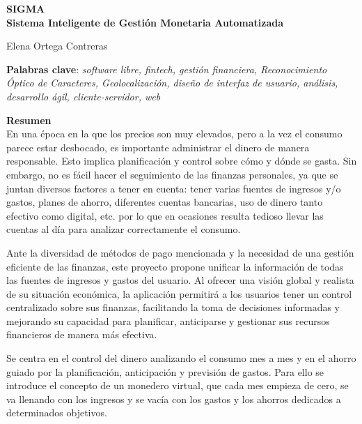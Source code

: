 \thispagestyle{empty}

\begin{center}
{\large\bfseries SIGMA \\ Sistema Inteligente de Gestión Monetaria Automatizada }\\
\end{center}
\begin{center}
Elena Ortega Contreras\\
\end{center}


\vspace{0.5cm}
\noindent\textbf{Palabras clave}: \textit{software libre, fintech, gestión financiera, Reconocimiento Óptico de Caracteres, Geolocalización, diseño de interfaz de usuario, análisis, desarrollo ágil, cliente-servidor, web}
\vspace{0.7cm}

\noindent\textbf{Resumen}\\

En una época en la que los precios son muy elevados, pero a la vez el consumo parece estar desbocado, es importante administrar el dinero de manera responsable. Esto implica planificación y control sobre cómo y dónde se gasta. Sin embargo, no es fácil hacer el seguimiento de las finanzas personales, ya que se juntan diversos factores a tener en cuenta: tener varias fuentes de ingresos y/o gastos, planes de ahorro, diferentes cuentas bancarias, uso de dinero tanto efectivo como digital, etc. por lo que en ocasiones resulta tedioso llevar las cuentas al día para analizar correctamente el consumo.

Ante la diversidad de métodos de pago mencionada y la necesidad de una gestión eficiente de las finanzas, este proyecto propone unificar la información de todas las fuentes de ingresos y gastos del usuario. Al ofrecer una visión global y realista de su situación económica, la aplicación permitirá a los usuarios tener un control centralizado sobre sus finanzas, facilitando la toma de decisiones informadas y mejorando su capacidad para planificar, anticiparse y gestionar sus recursos financieros de manera más efectiva.

Se centra en el control del dinero analizando el consumo mes a mes y en el ahorro guiado por la planificación, anticipación y previsión de gastos. Para ello se introduce el concepto de un monedero virtual, que cada mes empieza de cero, se va llenando con los ingresos y se vacía con los gastos y los ahorros dedicados a determinados objetivos. 

